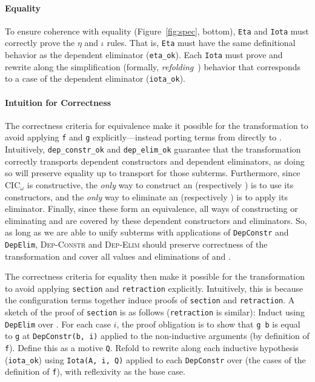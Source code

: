 \paragraph{Equality}
To ensure coherence with equality (Figure~\ref{fig:spec}, bottom),
\lstinline{Eta} and \lstinline{Iota} must correctly prove the $\eta$ and $\iota$ rules.
That is, \lstinline{Eta} must have the same definitional behavior as the dependent eliminator (\lstinline{eta_ok}).
Each \lstinline{Iota} must prove and rewrite along the simplification (formally, \textit{refolding}~\cite{boutillier:tel-01054723}) behavior that corresponds to a case of the dependent eliminator (\lstinline{iota_ok}).

\paragraph{Intuition for Correctness}
The correctness criteria for equivalence make it possible for the transformation
to avoid applying \lstinline{f} and \lstinline{g} explicitly---instead porting terms from \A directly to \B.
Intuitively, \lstinline{dep_constr_ok} and \lstinline{dep_elim_ok} guarantee that the transformation
correctly transports dependent constructors and dependent eliminators,
as doing so will preserve equality up to transport for those subterms.
Furthermore, since CIC$_{\omega}$ is constructive, the \textit{only} way to construct an \A (respectively \B) is to use its constructors,
and the \textit{only} way to eliminate an \A (respectively \B) is to apply its eliminator.
Finally, since these form an equivalence, all ways of constructing or eliminating \A and \B are covered by these dependent constructors and eliminators.
So, as long as we are able to unify subterms with applications of \lstinline{DepConstr} and \lstinline{DepElim},
\textsc{Dep-Constr} and \textsc{Dep-Elim} should preserve correctness of the transformation and cover all values and eliminations of \A and \B.

The correctness criteria for equality then make it possible for the transformation to
avoid applying \lstinline{section} and \lstinline{retraction} explicitly.
Intuitively, this is because the configuration terms together induce proofs of \lstinline{section}
and \lstinline{retraction}.
A sketch of the proof of \lstinline{section} is as follows (\lstinline{retraction} is similar):
Induct using \lstinline{DepElim} over \A.
For each case $i$, the proof obligation is to show that \lstinline{g b} is equal to \lstinline{g} at \lstinline{DepConstr(b, i)} applied to the non-inductive arguments (by definition of \lstinline{f}).
Define this as a motive \lstinline{Q}.
Refold to rewrite along each inductive hypothesis (\lstinline{iota_ok}) using \lstinline{Iota(A, i, Q)} applied to each \lstinline{DepConstr} over \B (the cases of the definition of \lstinline{f}), with reflexivity as the base case. %

